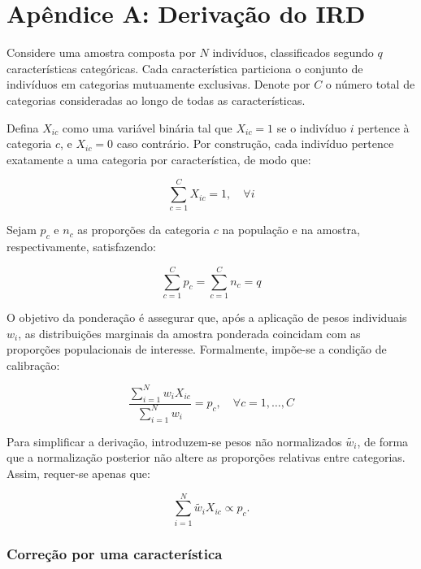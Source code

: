 \appendix
\section{Apêndice A: Derivação do IRD}

Considere uma amostra composta por $N$ indivíduos, classificados segundo $q$ características categóricas. Cada característica particiona o conjunto de indivíduos em categorias mutuamente exclusivas. Denote por $C$ o número total de categorias consideradas ao longo de todas as características.

Defina $X_{ic}$ como uma variável binária tal que $X_{ic} = 1$ se o indivíduo $i$ pertence à categoria $c$, e $X_{ic} = 0$ caso contrário. Por construção, cada indivíduo pertence exatamente a uma categoria por característica, de modo que:

\begin{equation}
    \sum_{c=1}^{C} X_{ic} = 1, \quad \forall i
\end{equation}

Sejam $p_c$ e $n_c$ as proporções da categoria $c$ na população e na amostra, respectivamente, satisfazendo:

\begin{equation}
    \sum_{c=1}^{C} p_c = \sum_{c=1}^{C} n_c = q
\end{equation}

O objetivo da ponderação é assegurar que, após a aplicação de pesos individuais 
$w_i$, as distribuições marginais da amostra ponderada coincidam com as proporções populacionais de interesse. Formalmente, impõe-se a condição de calibração:

\begin{equation}
    \frac{\sum_{i=1}^{N} w_i X_{ic}}{\sum_{i=1}^{N} w_i} = p_c, \quad \forall c = 1, \ldots, C
\end{equation}

Para simplificar a derivação, introduzem-se pesos não normalizados 
$\widetilde{w_i}$, de forma que a normalização posterior não altere as proporções relativas entre categorias. Assim, requer-se apenas que:

\begin{equation}
    \sum_{i=1}^{N} \widetilde{w_i} X_{ic} \propto p_c.
\end{equation}

\subsubsection*{Correção por uma característica}

